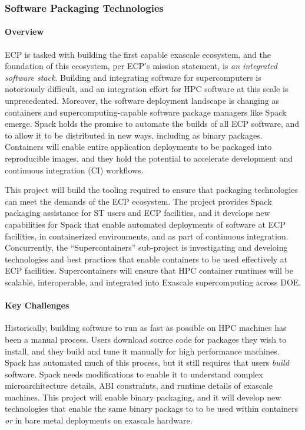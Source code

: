 \subsubsection{ Software Packaging Technologies} \label{subsubsect:sw-packaging}


\paragraph{Overview}

ECP is tasked with building the first capable exascale ecosystem, and the
foundation of this ecosystem, per ECP's mission statement, is {\it an
integrated software stack}.  Building and integrating software for
supercomputers is notoriously difficult, and an integration effort for
HPC software at this scale is unprecedented.  Moreover, the software
deployment landscape is changing as containers and supercomputing-capable
software package managers like Spack emerge.  Spack holds the promise to
automate the builds of all ECP software, and to allow it to be
distributed in new ways, including as binary packages.  Containers will
enable entire application deployments to be packaged into reproducible
images, and they hold the potential to accelerate development and
continuous integration (CI) workflows.

This project will build the tooling required to ensure that packaging
technologies can meet the demands of the ECP ecosystem.  The project
provides Spack packaging assistance for ST users and ECP facilities, and
it develops new capabilities for Spack that enable automated deployments
of software at ECP facilities, in containerized environments, and as part
of continuous integration.  Concurrently, the ``Supercontainers''
sub-project is investigating and develoing technologies and best
practices that enable containers to be used effectively at ECP
facilities. Supercontainers will ensure that HPC container runtimes will
be scalable, interoperable, and integrated into Exascale supercomputing
across DOE.


\paragraph{Key Challenges}

Historically, building software to run as fast as possible on HPC
machines has been a manual process.  Users download source code for
packages they wish to install, and they build and tune it manually for
high performance machines. Spack has automated much of this process, but
it still requires that users {\it build} software.  Spack needs
modifications to enable it to understand complex microarchitecture
details, ABI constraints, and runtime details of exascale machines.  This
project will enable binary packaging, and it will develop new
technologies that enable the same binary packags to to be used within
containers {\it or} in bare metal deployments on exascale hardware.

